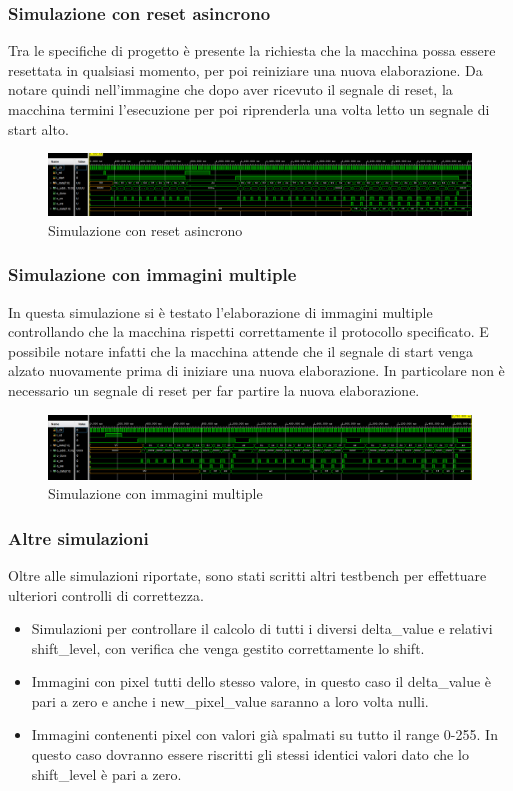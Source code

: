 \documentclass{article}
\begin{document}
\subsubsection{Simulazione con reset asincrono}
Tra le specifiche di progetto è presente la richiesta che la macchina possa essere resettata in qualsiasi momento, per poi reiniziare una nuova elaborazione. Da notare quindi nell'immagine che dopo aver ricevuto il segnale di reset, la macchina termini l'esecuzione per poi riprenderla una volta letto un segnale di start alto.
\begin{figure}[h]
    \includegraphics[width=\textwidth]{test-async-reset.png}
    \centering
    \caption{Simulazione con reset asincrono}
\end{figure}

\subsubsection{Simulazione con immagini multiple}
In questa simulazione si è testato l'elaborazione di immagini multiple controllando che la macchina rispetti correttamente il protocollo specificato. E possibile notare infatti che la macchina attende che il segnale di start venga alzato nuovamente prima di iniziare una nuova elaborazione. In particolare non è necessario un segnale di reset per far partire la nuova elaborazione.
\begin{figure}[h]
    \includegraphics[width=\textwidth]{test-multiple-images.png}
    \centering
    \caption{Simulazione con immagini multiple}
\end{figure}

\subsubsection{Altre simulazioni}
Oltre alle simulazioni riportate, sono stati scritti altri testbench per effettuare ulteriori controlli di correttezza.
\begin{itemize}
    \item Simulazioni per controllare il calcolo di tutti i diversi delta\_value e relativi shift\_level, con verifica che venga gestito correttamente lo shift.
    \item Immagini con pixel tutti dello stesso valore, in questo caso il delta\_value è pari a zero e anche i new\_pixel\_value saranno a loro volta nulli.
    \item Immagini contenenti pixel con valori già spalmati su tutto il range 0-255. In questo caso dovranno essere riscritti gli stessi identici valori dato che lo shift\_level è pari a zero.
\end{itemize}
\end{document}
